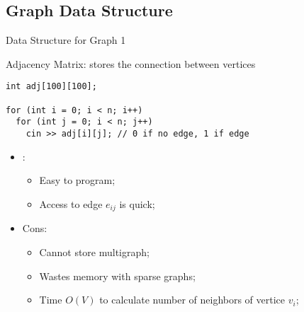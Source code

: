 \subsection{Graph Data Structure}


\begin{frame}[fragile]{Data Structure for Graph 1}

\begin{block}{Adjacency Matrix: stores the connection between vertices}
\begin{verbatim}
int adj[100][100];

for (int i = 0; i < n; i++)
  for (int j = 0; i < n; j++)
    cin >> adj[i][j]; // 0 if no edge, 1 if edge
\end{verbatim}

  \begin{itemize}
    \item {}:
    \begin{itemize}
      \item Easy to program;
      \item Access to edge $e_{ij}$ is quick;
    \end{itemize}
    \item \alert{Cons}:
      \begin{itemize}
      \item Cannot store multigraph;
      \item Wastes memory with sparse graphs;
      \item Time $O(V)$ to calculate number of neighbors of vertice $v_i$;
      \end{itemize}
    \end{itemize}
  \end{block}
\end{frame}

